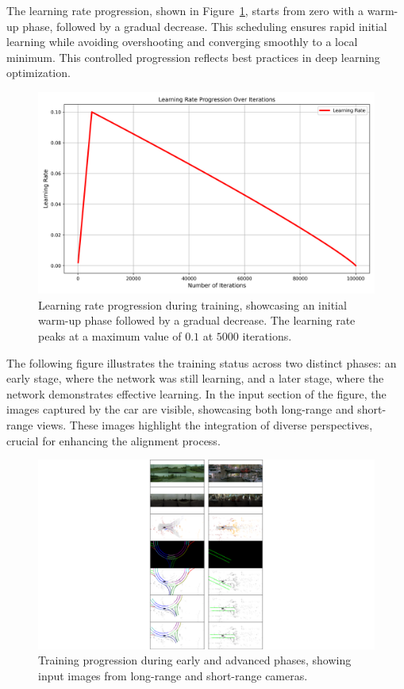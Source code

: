 The learning rate progression, shown in Figure~\ref{fig:learning_rate_2}, starts from zero with a warm-up phase, followed by a gradual decrease. This scheduling ensures rapid initial learning while avoiding overshooting and converging smoothly to a local minimum. This controlled progression reflects best practices in deep learning optimization.
\begin{figure}[H]
    \centering
    \includegraphics[width=0.75\linewidth]{LateX//figs/BEVlearning_rate_progression.png}
    \caption{Learning rate progression during training, showcasing an initial warm-up phase followed by a gradual decrease. The learning rate peaks at a maximum value of $0.1$ at $5000$ iterations.}
    \label{fig:learning_rate_2}
\end{figure}

The following figure illustrates the training status across two distinct phases: an early stage, where the network was still learning, and a later stage, where the network demonstrates effective learning. In the input section of the figure, the images captured by the car are visible, showcasing both long-range and short-range views. These images highlight the integration of diverse perspectives, crucial for enhancing the alignment process.
\begin{figure}[H]
    \centering
    \includegraphics[width=0.8\linewidth]{LateX//figs/bev_traininig_phases.pdf}
    \caption{Training progression during early and advanced phases, showing input images from long-range and short-range cameras.}
    \label{fig:bev_training_phases}
\end{figure}

